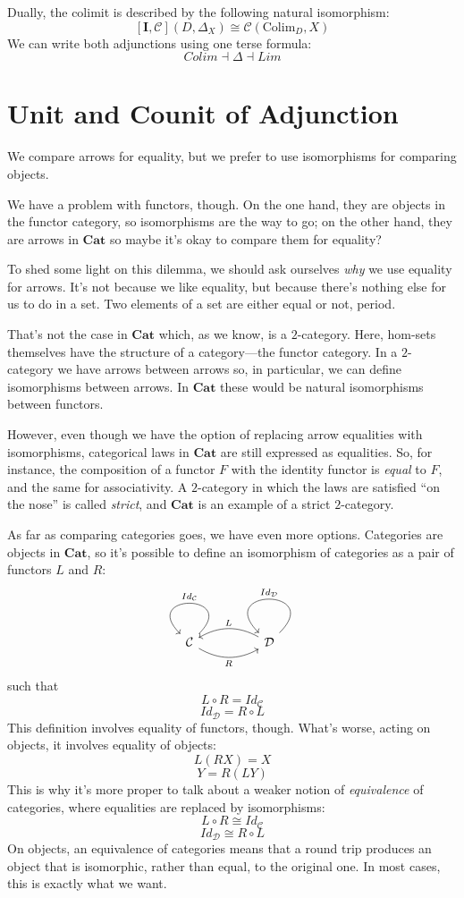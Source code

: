 \documentclass[DaoFP]{subfiles}
\begin{document}
Dually, the colimit is described by the following natural isomorphism:
\[ [\mathbf{I}, \mathcal{C}](D, \Delta_X)  \cong \mathcal{C}( \text{Colim}_D, X) \]
We can write both adjunctions using one terse formula:
\[ Colim \dashv \Delta \dashv Lim\]

\section{Unit and Counit of Adjunction}

We compare arrows for equality, but we prefer to use isomorphisms for comparing objects. 

We have a problem with functors, though. On the one hand, they are objects in the functor category, so isomorphisms are the way to go; on the other hand, they are arrows in $\mathbf{Cat}$ so maybe it's okay to compare them for equality?

To shed some light on this dilemma, we should ask ourselves \emph{why} we use equality for arrows. It's not because we like equality, but because there's nothing else for us to do in a set. Two elements of a set are either equal or not, period. 

That's not the case in  $\mathbf{Cat}$ which, as we know, is a $2$-category. Here, hom-sets themselves have the structure of a category---the functor category. In a $2$-category we have arrows between arrows so, in particular, we can define isomorphisms between arrows. In $\mathbf{Cat}$ these would be natural isomorphisms between functors.

However, even though we have the option of replacing arrow equalities with isomorphisms, categorical laws in $\mathbf{Cat}$ are still expressed as equalities. So, for instance, the composition of a functor $F$ with the identity functor is \emph{equal} to $F$, and the same for associativity. A $2$-category in which the laws are satisfied ``on the nose'' is called \emph{strict}, and $\mathbf{Cat}$ is an example of a strict $2$-category. 

As far as comparing categories goes, we have even more options. Categories are objects in $\mathbf{Cat}$, so it's possible to define an isomorphism of categories as a pair of functors $L$ and $R$:
\[
 \begin{tikzcd}
  \mathcal{C}
  \arrow[rr, bend right, "R"']
  \arrow[loop, "Id_{ \mathcal{C}} "']
  &&
  \mathcal{D}
  \arrow[ll, bend right, "L"']
  \arrow[loop, "Id_{ \mathcal{D}} "']
  \end{tikzcd}
\]
such that
\[ L \circ R = Id_{ \mathcal{C}} \]
\[ Id_{ \mathcal{D}} = R \circ L  \]
This definition involves equality of functors, though. What's worse, acting on objects, it involves equality of objects:
\[ L (R X) = X \]
\[ Y = R (L Y) \]
This is why it's more proper to talk about a weaker notion of \emph{equivalence} of categories, where equalities are replaced by isomorphisms:
\[ L \circ R \cong Id_{ \mathcal{C}} \]
\[ Id_{ \mathcal{D}} \cong R \circ L \]
On objects, an equivalence of categories means that a round trip produces an object that is isomorphic, rather than equal, to the original one. In most cases, this is exactly what we want.
\end{document}
